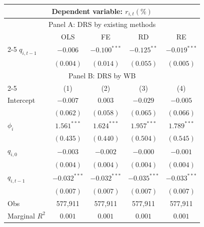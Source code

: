 \begin{tabular}{lcccc}
  \toprule \multicolumn{5}{c}{Dependent variable: $r_{i,t} (\%)$} \\
 \hline
    \multicolumn{5}{c}{Panel A: DRS by existing methods} \\
 
 & OLS & FE & RD & RE \\
 
 \cmidrule(l){2-5} 
 $q_{i,t-1}$ & $-0.006$ & $-0.100^{***}$ & $-0.125^{**}$ & $-0.019^{***}$ \\ 
   \vspace{5pt} 
 & $(0.004)$ & $(0.014)$ & $(0.055)$ & $(0.005)$ \\ 
   \hline \multicolumn{5}{c}{Panel B: DRS by WB} \\
 
 \cmidrule(l){2-5} & (1) & (2) & (3) & (4) \vspace{5pt} \\
Intercept & $-0.007$ & $0.003$ & $-0.029$ & $-0.005$ \\ 
   & $(0.062)$ & $(0.058)$ & $(0.065)$ & $(0.066)$ \\ 
  $\phi_i$ & $1.561^{***}$ & $1.624^{***}$ & $1.957^{***}$ & $1.789^{***}$ \\ 
   & $(0.435)$ & $(0.440)$ & $(0.504)$ & $(0.545)$ \\ 
  $q_{i,0}$ & $-0.003$ & $-0.002$ & $-0.000$ & $-0.001$ \\ 
   & $(0.004)$ & $(0.004)$ & $(0.004)$ & $(0.004)$ \\ 
  $q_{i,t-1}$ & $-0.032^{***}$ & $-0.032^{***}$ & $-0.035^{***}$ & $-0.033^{***}$ \\ 
   \vspace{5pt} 
 & $(0.007)$ & $(0.007)$ & $(0.007)$ & $(0.007)$ \\ 
  Obs & 577,911 & 577,911 & 577,911 & 577,911 \\ 
  Marginal $R^2$ & $0.001$ & $0.001$ & $0.001$ & $0.001$ \\ 
   \bottomrule 
\end{tabular}
